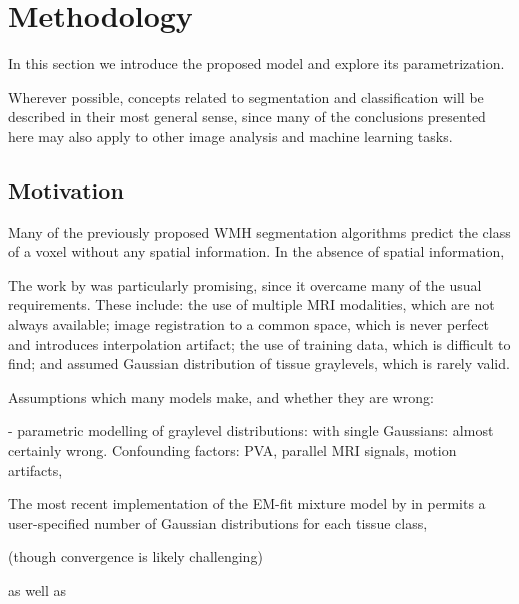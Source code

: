 \chapter{Methodology}
In this section we introduce the proposed model and explore its parametrization.
\par
Wherever possible, concepts related to segmentation and classification will be described in their most general sense, since many of the conclusions presented here may also apply to other image analysis and machine learning tasks.
\section{Motivation}

Many of the previously proposed WMH segmentation algorithms predict the class of a voxel without any spatial information. In the absence of spatial information, 

The work by \citeauthor{Khademi2012} \cite{Khademi2012,Khademi2014,Khademi2015} was particularly promising, since it overcame many of the usual requirements. These include: the use of multiple MRI modalities, which are not always available; image registration to a common space, which is never perfect and introduces interpolation artifact; the use of training data, which is difficult to find; and assumed Gaussian distribution of tissue graylevels, which is rarely valid.



Assumptions which many models make, and whether they are wrong:

- parametric modelling of graylevel distributions: with single Gaussians: almost certainly wrong. Confounding factors: PVA, parallel MRI signals, motion artifacts, 

The most recent implementation of the EM-fit mixture model by \citeauthor{Ashburner2005} in \cite{Ashburner2005} permits a user-specified number of Gaussian distributions for each tissue class, 

(though convergence is likely challenging)

as well as 

